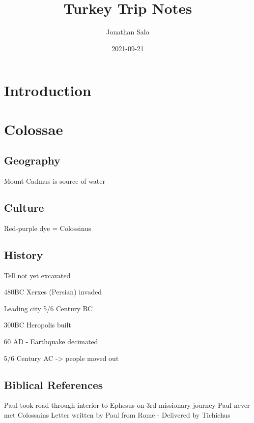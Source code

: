 \documentclass[
]{book}
\title{Turkey Trip Notes}
\author{Jonathan Salo}
\date{2021-09-21}
\begin{document}
\maketitle

{
\setcounter{tocdepth}{1}
\tableofcontents
}
\hypertarget{intro}{%
\chapter{Introduction}\label{intro}}

\hypertarget{colossae}{%
\chapter{Colossae}\label{colossae}}

\hypertarget{geography}{%
\section{Geography}\label{geography}}

Mount Cadmus is source of water

\hypertarget{culture}{%
\section{Culture}\label{culture}}

Red-purple dye = Colossinus

\hypertarget{history}{%
\section{History}\label{history}}

Tell not yet excavated

480BC Xerxes (Persian) invaded

Leading city 5/6 Century BC

300BC Heropolis built

60 AD - Earthquake decimated

5/6 Century AC -\textgreater{} people moved out

\hypertarget{biblical-references}{%
\section{Biblical References}\label{biblical-references}}

Paul took road through interior to Ephesus on 3rd missionary journey
Paul never met Colossains
Letter written by Paul from Rome - Delivered by Tichichus
\end{document}
